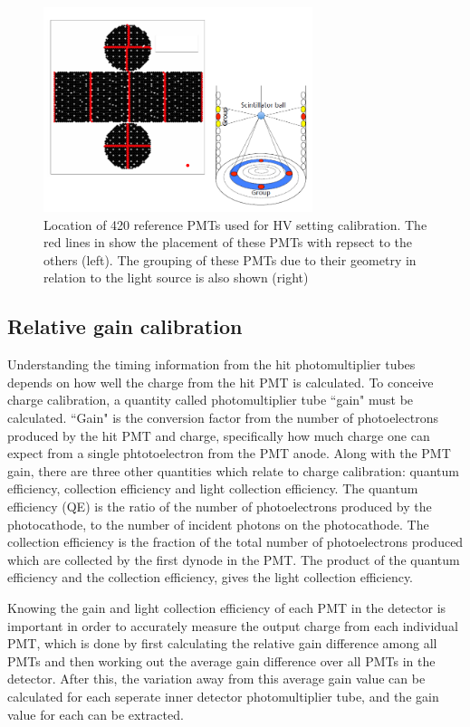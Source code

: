 \begin{figure}
    \centering
    \includegraphics[width=0.7\textwidth]{Figures/hvcalib.png}
\caption{Location of 420 reference PMTs used for HV setting calibration. The red lines in show the placement of these PMTs with repsect to the others (left). The grouping of these PMTs due to their geometry in relation to the light source is also shown (right) }
    \label{fig:hvcalib}
\end{figure}




\subsection{Relative gain calibration}

Understanding the timing information from the hit photomultiplier tubes depends on how well the charge from the hit PMT is calculated. To conceive charge calibration, a quantity called photomultiplier tube ``gain" must be calculated. ``Gain" is the conversion factor from the number of photoelectrons produced by the hit PMT and charge, specifically how much charge one can expect from a single phtotoelectron from the PMT anode. Along with the PMT gain, there are three other quantities which relate to charge calibration: quantum efficiency, collection efficiency and light collection efficiency. 
\newline
The quantum efficiency (QE) is the ratio of the number of photoelectrons produced by the photocathode, to the number of incident photons on the photocathode. The collection efficiency is the fraction of the total number of photoelectrons produced which are collected by the first dynode in the PMT. The product of the quantum efficiency and the collection efficiency, gives the light collection efficiency.  

 Knowing the gain and light collection efficiency of each PMT in the detector is important in order to accurately measure the output charge from each individual PMT, which is done by first calculating the relative gain difference among all PMTs and then working out the average gain difference over all PMTs in the detector. After this, the variation away from this average gain value can be calculated for each seperate inner detector photomultiplier tube, and the gain value for each can be extracted. 

